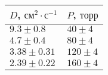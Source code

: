 \begin{tabular}{ll}
\toprule
$D$, $см^2 \cdot с^{-1}$ & $P$, $торр$ \\
\midrule
$9.3 \pm 0.8$ & $40 \pm 4$ \\
$4.7 \pm 0.4$ & $80 \pm 4$ \\
$3.38 \pm 0.31$ & $120 \pm 4$ \\
$2.39 \pm 0.22$ & $160 \pm 4$ \\
\bottomrule
\end{tabular}
